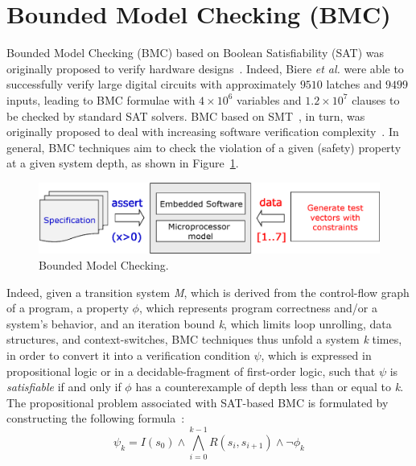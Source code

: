 \documentclass[format=acmsmall, review=false, screen=true]{acmart}
\begin{document}
\section{Bounded Model Checking (BMC)}
\label{Preliminaries}

Bounded Model Checking (BMC) based on Boolean Satisfiability (SAT) was originally proposed to verify hardware designs~\cite{Biere99,handbook09}. Indeed, Biere {\it et al.} were able to successfully verify large digital circuits with approximately $9510$ latches and $9499$ inputs, leading to BMC formulae with $4 \times 10^6$ variables and $1.2 \times 10^7$ clauses to be checked by standard SAT solvers. BMC based on SMT~\cite{BarrettSST09}, in turn, was originally proposed to deal with increasing software verification complexity~\cite{Armando2009}. 
%
In general, BMC techniques aim to check the violation of a given (safety) property at a given system depth, as shown in Figure~\ref{bounded-model-checking}. 
%
\begin{figure}[h]
	\centering
	\includegraphics[scale=0.35]{figure2.eps}
	\caption{Bounded Model Checking.}
	\label{bounded-model-checking}
\end{figure}

Indeed, given a transition system \textit{M}, which is derived from the control-flow graph of a program, a property $\phi$, which represents program correctness and/or a system's behavior, and an iteration bound \textit{k}, which limits loop unrolling, data structures, and context-switches, BMC techniques thus unfold a system \textit{k} times, in order to convert it into a verification condition $\psi$, which is expressed in propositional logic or in a decidable-fragment of first-order logic, such that $\psi$ is \textit{satisfiable} if and only if $\phi$ has a counterexample of depth less than or equal to \textit{k}. The propositional problem associated with SAT-based BMC is formulated by constructing the following formula~\cite{Biere99}:
%
\begin{equation}
\label{bounded-model-checking-biere}
\psi_{k} = I\left(s_{0}\right) \wedge \bigwedge^{k-1}_{i=0} R\left(s_{i},s_{i+1}\right) \wedge \neg \phi_{k}
\end{equation}
\end{document}

